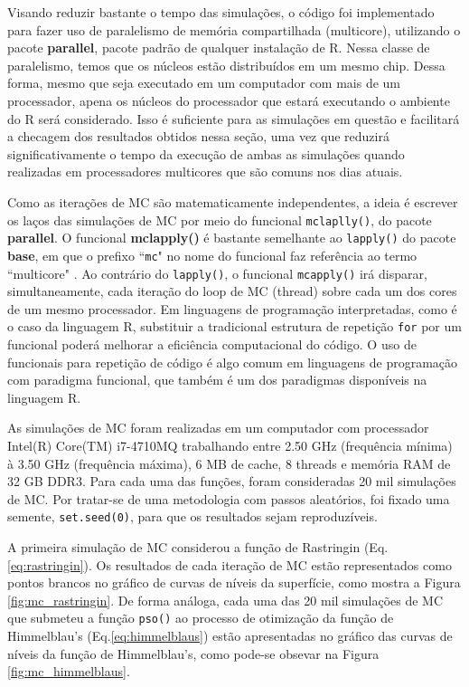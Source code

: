 \documentclass[10pt,letterpaper]{article}
\begin{document}
Visando reduzir bastante o tempo das simulações, o código foi implementado para fazer uso de paralelismo de memória compartilhada (multicore), utilizando o pacote \textbf{parallel}, pacote padrão de qualquer instalação de \textsc{R}. Nessa classe de paralelismo, temos que os núcleos estão distribuídos em um mesmo chip. Dessa forma, mesmo que seja executado em um computador com mais de um processador, apena os núcleos do processador que estará executando o ambiente do \textsc{R} será considerado. Isso é suficiente para as simulações em questão e facilitará a checagem dos resultados obtidos nessa seção, uma vez que reduzirá significativamente o tempo da execução de ambas as simulações quando realizadas em processadores multicores que são comuns nos dias atuais.
 
 
Como as iterações de MC são matematicamente independentes, a ideia é escrever os laços das simulações de MC por meio do funcional \texttt{mclaplly()}, do pacote \textbf{parallel}. O funcional \textbf{mclapply()} é bastante semelhante ao \texttt{lapply()} do pacote \textbf{base}, em que o prefixo ``\texttt{mc}" no nome do funcional faz referência ao termo ``multicore" . Ao contrário do \texttt{lapply()}, o funcional \texttt{mcapply()} irá disparar, simultaneamente, cada iteração do loop de MC (thread) sobre cada um dos cores de um mesmo processador.  Em linguagens de programação interpretadas, como é o caso da linguagem \textsc{R}, substituir a tradicional estrutura de repetição \texttt{for} por um funcional poderá melhorar a eficiência computacional do código. O uso de funcionais para repetição de código é algo comum em linguagens de programação com paradigma funcional, que também é um dos paradigmas disponíveis na linguagem \textsc{R}.


As simulações de MC foram realizadas em um computador com processador Intel(R) Core(TM) i7-4710MQ trabalhando entre 2.50 GHz (frequência mínima) à 3.50 GHz (frequência máxima), 6 MB de cache, 8 threads e memória RAM de 32 GB DDR3. Para cada uma das funções, foram consideradas 20 mil simulações de MC. Por tratar-se de uma metodologia com passos aleatórios, foi fixado uma semente, \texttt{set.seed(0)}, para que os resultados sejam reproduzíveis. 

A primeira simulação de MC considerou a função de Rastringin (Eq. \ref{eq:rastringin}). Os resultados de cada iteração de MC estão representados como pontos brancos no gráfico de curvas de níveis da superfície, como mostra a Figura \ref{fig:mc_rastringin}. De forma análoga, cada uma das 20 mil simulações de MC que submeteu a função \texttt{pso()} ao processo de otimização da função de Himmelblau's (Eq.\ref{eq:himmelblaus}) estão apresentadas no gráfico das curvas de níveis da função de Himmelblau's, como pode-se obsevar na Figura \ref{fig:mc_himmelblaus}.
\end{document}
